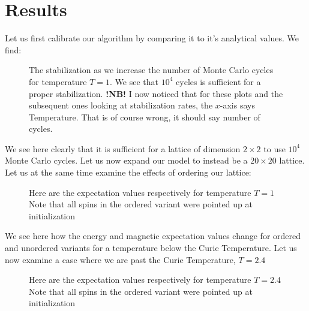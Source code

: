 \documentclass{article}
\begin{document}
\section{Results}
Let us first calibrate our algorithm by comparing it to it's analytical values. \newline We find:
\begin{figure}[ht!]
\centering
{}
\newline
{}
\caption{The stabilization as we increase the number of Monte Carlo cycles for temperature $T = 1$. We see that $10^4$ cycles is sufficient for a proper stabilization. \newline
\textbf{!NB!} I now noticed that for these plots and the subsequent ones looking at stabilization rates, the $x$-axis says Temperature. That is of course wrong, it should say number of cycles.}

\end{figure}
\newline
We see here clearly that it is sufficient for a lattice of dimension $2 \times 2$ to use $10^4$ Monte Carlo cycles. \newpage
Let us now expand our model to instead be a $20 \times 20$ lattice. Let us at the same time examine the effects of ordering our lattice:
\begin{figure}[ht!]
\centering
{}
\newline
{}
\caption{Here are the expectation values respectively for temperature $T = 1$ \newline
Note that all spins in the ordered variant were pointed up at initialization}
\end{figure} \newpage
We see here how the energy and magnetic expectation values change for ordered and unordered variants for a temperature below the Curie Temperature. Let us now examine a case where we are past the Curie Temperature, $T = 2.4$
\begin{figure}[ht!]
\centering
{}
\newline
{}
\caption{Here are the expectation values respectively for temperature $T = 2.4$ \newline
Note that all spins in the ordered variant were pointed up at initialization}
\end{figure} \newline
\end{document}
